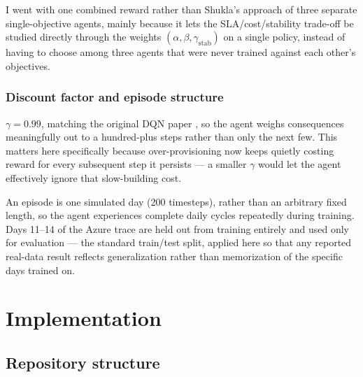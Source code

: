 \documentclass{rapportINPTCLOUD}
\begin{document}
I went with one combined reward rather than Shukla's approach of three separate single-objective agents, mainly because it lets the SLA/cost/stability trade-off be studied directly through the weights $(\alpha, \beta, \gamma_{\text{stab}})$ on a single policy, instead of having to choose among three agents that were never trained against each other's objectives.

\subsection{Discount factor and episode structure}

$\gamma = 0.99$, matching the original DQN paper \cite{mnih2015}, so the agent weighs consequences meaningfully out to a hundred-plus steps rather than only the next few. This matters here specifically because over-provisioning now keeps quietly costing reward for every subsequent step it persists — a smaller $\gamma$ would let the agent effectively ignore that slow-building cost.

An episode is one simulated day (200 timesteps), rather than an arbitrary fixed length, so the agent experiences complete daily cycles repeatedly during training. Days 11--14 of the Azure trace are held out from training entirely and used only for evaluation — the standard train/test split, applied here so that any reported real-data result reflects generalization rather than memorization of the specific days trained on.

\chapter{Implementation}
\label{chap:impl}

\section{Repository structure}
\end{document}
